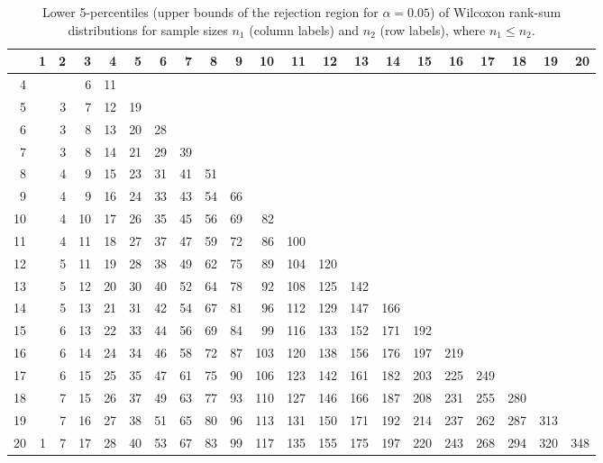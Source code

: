 \begin{table}[ht]
\centering
\begin{tabular}{@{}r@{~~}r@{~~}r@{~~}r@{~~}r@{~~}r@{~~}r@{~~}r@{~~}r@{~~}r@{~~}r@{~~}r@{~~}r@{~~}r@{~~}r@{~~}r@{~~}r@{~~}r@{~~}r@{~~}r@{~~}r@{}}
  \hline
 & 1 & 2 & 3 & 4 & 5 & 6 & 7 & 8 & 9 & 10 & 11 & 12 & 13 & 14 & 15 & 16 & 17 & 18 & 19 & 20 \\ 
  \hline
  4 &  &  & 6 & 11 &  &  &  &  &  &  &  &  &  &  &  &  &  &  &  &  \\ 
  5 &  & 3 & 7 & 12 & 19 &  &  &  &  &  &  &  &  &  &  &  &  &  &  &  \\ 
  6 &  & 3 & 8 & 13 & 20 & 28 &  &  &  &  &  &  &  &  &  &  &  &  &  &  \\ 
  7 &  & 3 & 8 & 14 & 21 & 29 & 39 &  &  &  &  &  &  &  &  &  &  &  &  &  \\ 
  8 &  & 4 & 9 & 15 & 23 & 31 & 41 & 51 &  &  &  &  &  &  &  &  &  &  &  &  \\ 
  9 &  & 4 & 9 & 16 & 24 & 33 & 43 & 54 & 66 &  &  &  &  &  &  &  &  &  &  &  \\ 
  10 &  & 4 & 10 & 17 & 26 & 35 & 45 & 56 & 69 & 82 &  &  &  &  &  &  &  &  &  &  \\ 
  11 &  & 4 & 11 & 18 & 27 & 37 & 47 & 59 & 72 & 86 & 100 &  &  &  &  &  &  &  &  &  \\ 
  12 &  & 5 & 11 & 19 & 28 & 38 & 49 & 62 & 75 & 89 & 104 & 120 &  &  &  &  &  &  &  &  \\ 
  13 &  & 5 & 12 & 20 & 30 & 40 & 52 & 64 & 78 & 92 & 108 & 125 & 142 &  &  &  &  &  &  &  \\ 
  14 &  & 5 & 13 & 21 & 31 & 42 & 54 & 67 & 81 & 96 & 112 & 129 & 147 & 166 &  &  &  &  &  &  \\ 
  15 &  & 6 & 13 & 22 & 33 & 44 & 56 & 69 & 84 & 99 & 116 & 133 & 152 & 171 & 192 &  &  &  &  &  \\ 
  16 &  & 6 & 14 & 24 & 34 & 46 & 58 & 72 & 87 & 103 & 120 & 138 & 156 & 176 & 197 & 219 &  &  &  &  \\ 
  17 &  & 6 & 15 & 25 & 35 & 47 & 61 & 75 & 90 & 106 & 123 & 142 & 161 & 182 & 203 & 225 & 249 &  &  &  \\ 
  18 &  & 7 & 15 & 26 & 37 & 49 & 63 & 77 & 93 & 110 & 127 & 146 & 166 & 187 & 208 & 231 & 255 & 280 &  &  \\ 
  19 &  & 7 & 16 & 27 & 38 & 51 & 65 & 80 & 96 & 113 & 131 & 150 & 171 & 192 & 214 & 237 & 262 & 287 & 313 &  \\ 
  20 & 1 & 7 & 17 & 28 & 40 & 53 & 67 & 83 & 99 & 117 & 135 & 155 & 175 & 197 & 220 & 243 & 268 & 294 & 320 & 348 \\ 
   \hline
\end{tabular}
\caption{Lower 5-percentiles (upper bounds of the rejection region for $\alpha=0.05$) of Wilcoxon rank-sum distributions for sample sizes $n_1$ (column labels) and $n_2$ (row labels), where ${n_1}\leq{n_2}$.}
\label{tab:w0.05}
\label{tab:wilcox}
\end{table}
